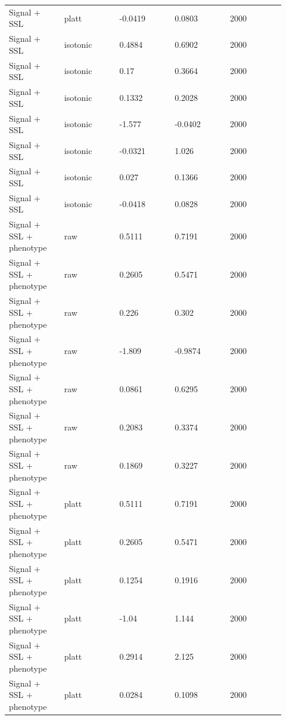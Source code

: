 \documentclass[11pt]{article}
\begin{document}
\begin{landscape}
\begin{longtable}{L{0.184\linewidth} L{0.184\linewidth} L{0.184\linewidth} L{0.184\linewidth} L{0.184\linewidth}}
Signal + SSL & platt & -\allowbreak{}0.\allowbreak{}0419 & 0.\allowbreak{}0803 & 2000 \\
Signal + SSL & isotonic & 0.\allowbreak{}4884 & 0.\allowbreak{}6902 & 2000 \\
Signal + SSL & isotonic & 0.\allowbreak{}17 & 0.\allowbreak{}3664 & 2000 \\
Signal + SSL & isotonic & 0.\allowbreak{}1332 & 0.\allowbreak{}2028 & 2000 \\
Signal + SSL & isotonic & -\allowbreak{}1.\allowbreak{}577 & -\allowbreak{}0.\allowbreak{}0402 & 2000 \\
Signal + SSL & isotonic & -\allowbreak{}0.\allowbreak{}0321 & 1.\allowbreak{}026 & 2000 \\
Signal + SSL & isotonic & 0.\allowbreak{}027 & 0.\allowbreak{}1366 & 2000 \\
Signal + SSL & isotonic & -\allowbreak{}0.\allowbreak{}0418 & 0.\allowbreak{}0828 & 2000 \\
Signal + SSL + phenotype & raw & 0.\allowbreak{}5111 & 0.\allowbreak{}7191 & 2000 \\
Signal + SSL + phenotype & raw & 0.\allowbreak{}2605 & 0.\allowbreak{}5471 & 2000 \\
Signal + SSL + phenotype & raw & 0.\allowbreak{}226 & 0.\allowbreak{}302 & 2000 \\
Signal + SSL + phenotype & raw & -\allowbreak{}1.\allowbreak{}809 & -\allowbreak{}0.\allowbreak{}9874 & 2000 \\
Signal + SSL + phenotype & raw & 0.\allowbreak{}0861 & 0.\allowbreak{}6295 & 2000 \\
Signal + SSL + phenotype & raw & 0.\allowbreak{}2083 & 0.\allowbreak{}3374 & 2000 \\
Signal + SSL + phenotype & raw & 0.\allowbreak{}1869 & 0.\allowbreak{}3227 & 2000 \\
Signal + SSL + phenotype & platt & 0.\allowbreak{}5111 & 0.\allowbreak{}7191 & 2000 \\
Signal + SSL + phenotype & platt & 0.\allowbreak{}2605 & 0.\allowbreak{}5471 & 2000 \\
Signal + SSL + phenotype & platt & 0.\allowbreak{}1254 & 0.\allowbreak{}1916 & 2000 \\
Signal + SSL + phenotype & platt & -\allowbreak{}1.\allowbreak{}04 & 1.\allowbreak{}144 & 2000 \\
Signal + SSL + phenotype & platt & 0.\allowbreak{}2914 & 2.\allowbreak{}125 & 2000 \\
Signal + SSL + phenotype & platt & 0.\allowbreak{}0284 & 0.\allowbreak{}1098 & 2000 \\

\end{longtable}
\end{landscape}
\end{document}
